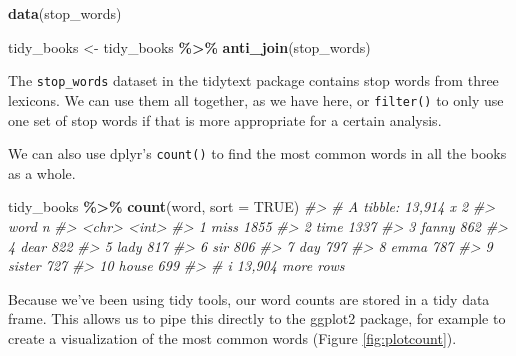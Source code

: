 \documentclass[
]{book}
\newenvironment{Shaded}{\begin{snugshade}}{\end{snugshade}}
\newcommand{\AttributeTok}[1]{\textcolor[rgb]{0.13,0.29,0.53}{#1}}
\newcommand{\CommentTok}[1]{\textcolor[rgb]{0.56,0.35,0.01}{\textit{#1}}}
\newcommand{\ConstantTok}[1]{\textcolor[rgb]{0.56,0.35,0.01}{#1}}
\newcommand{\FunctionTok}[1]{\textcolor[rgb]{0.13,0.29,0.53}{\textbf{#1}}}
\newcommand{\NormalTok}[1]{#1}
\newcommand{\OtherTok}[1]{\textcolor[rgb]{0.56,0.35,0.01}{#1}}
\newcommand{\SpecialCharTok}[1]{\textcolor[rgb]{0.81,0.36,0.00}{\textbf{#1}}}
\begin{document}
\begin{Shaded}
\begin{Highlighting}[]
\FunctionTok{data}\NormalTok{(stop\_words)}

\NormalTok{tidy\_books }\OtherTok{\textless{}{-}}\NormalTok{ tidy\_books }\SpecialCharTok{\%\textgreater{}\%}
  \FunctionTok{anti\_join}\NormalTok{(stop\_words)}
\end{Highlighting}
\end{Shaded}

The \texttt{stop\_words} dataset in the tidytext package contains stop words from three lexicons. We can use them all together, as we have here, or \texttt{filter()} to only use one set of stop words if that is more appropriate for a certain analysis.

We can also use dplyr's \texttt{count()} to find the most common words in all the books as a whole.

\begin{Shaded}
\begin{Highlighting}[]
\NormalTok{tidy\_books }\SpecialCharTok{\%\textgreater{}\%}
  \FunctionTok{count}\NormalTok{(word, }\AttributeTok{sort =} \ConstantTok{TRUE}\NormalTok{) }
\CommentTok{\#\textgreater{} \# A tibble: 13,914 x 2}
\CommentTok{\#\textgreater{}    word       n}
\CommentTok{\#\textgreater{}    \textless{}chr\textgreater{}  \textless{}int\textgreater{}}
\CommentTok{\#\textgreater{}  1 miss    1855}
\CommentTok{\#\textgreater{}  2 time    1337}
\CommentTok{\#\textgreater{}  3 fanny    862}
\CommentTok{\#\textgreater{}  4 dear     822}
\CommentTok{\#\textgreater{}  5 lady     817}
\CommentTok{\#\textgreater{}  6 sir      806}
\CommentTok{\#\textgreater{}  7 day      797}
\CommentTok{\#\textgreater{}  8 emma     787}
\CommentTok{\#\textgreater{}  9 sister   727}
\CommentTok{\#\textgreater{} 10 house    699}
\CommentTok{\#\textgreater{} \# i 13,904 more rows}
\end{Highlighting}
\end{Shaded}

Because we've been using tidy tools, our word counts are stored in a tidy data frame. This allows us to pipe this directly to the ggplot2 package, for example to create a visualization of the most common words (Figure \ref{fig:plotcount}).
\end{document}
